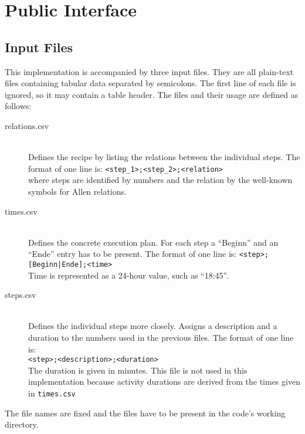 \chapter{Public Interface}

  \section{Input Files}
    
    This implementation is accompanied by three input files. They are all
    plain-text files containing tabular data separated by semicolons. The first line of
    each file is ignored, so it may contain a table header. The files and their
    usage are defined as follows:
    
    \begin{description}
        \item[relations.csv] \hfill \\
            Defines the recipe by listing the relations between the individual
            steps. The format of one line is:
            \texttt{<step\_1>;<step\_2>;<relation>}\\
            where steps are identified by numbers and the relation by the
            well-known symbols for Allen relations.
        \item[times.csv] \hfill \\
            Defines the concrete execution plan. For each step a ``Beginn'' and
            an ``Ende'' entry has to be present. The format of one line is:
            \texttt{<step>;[Beginn|Ende];<time>}\\
            Time is represented as a 24-hour value, such as ``18:45''.
        \item[steps.csv] \hfill \\
            Defines the individual steps more closely. Assigns a description and
            a duration to the numbers used in the previous files. The format of
            one line is:\\
            \texttt{<step>;<description>;<duration>}\\
            The duration is given in minutes. This file is not used in this
            implementation because activity durations are derived from the times
            given in \texttt{times.csv}
    \end{description}
    
    The file names are fixed and the files have to be present in the code's
    working directory.
      
